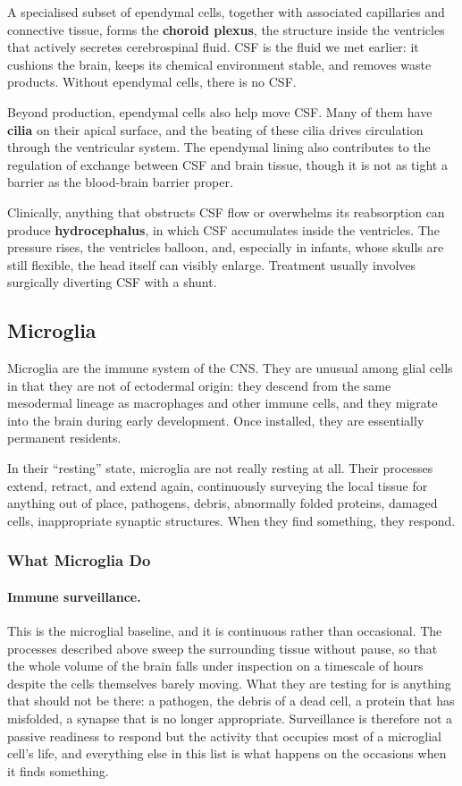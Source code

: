 \documentclass[11pt]{article}
\begin{document}
A specialised subset of ependymal cells, together with associated capillaries and connective tissue, forms the \textbf{choroid plexus}, the structure inside the ventricles that actively secretes cerebrospinal fluid. CSF is the fluid we met earlier: it cushions the brain, keeps its chemical environment stable, and removes waste products. Without ependymal cells, there is no CSF.

Beyond production, ependymal cells also help move CSF. Many of them have \textbf{cilia} on their apical surface, and the beating of these cilia drives circulation through the ventricular system. The ependymal lining also contributes to the regulation of exchange between CSF and brain tissue, though it is not as tight a barrier as the blood-brain barrier proper.

Clinically, anything that obstructs CSF flow or overwhelms its reabsorption can produce \textbf{hydrocephalus}, in which CSF accumulates inside the ventricles. The pressure rises, the ventricles balloon, and, especially in infants, whose skulls are still flexible, the head itself can visibly enlarge. Treatment usually involves surgically diverting CSF with a shunt.

\subsection{Microglia}

Microglia are the immune system of the CNS. They are unusual among glial cells in that they are not of ectodermal origin: they descend from the same mesodermal lineage as macrophages and other immune cells, and they migrate into the brain during early development. Once installed, they are essentially permanent residents.

In their ``resting'' state, microglia are not really resting at all. Their processes extend, retract, and extend again, continuously surveying the local tissue for anything out of place, pathogens, debris, abnormally folded proteins, damaged cells, inappropriate synaptic structures. When they find something, they respond.

\subsubsection{What Microglia Do}

\paragraph{Immune surveillance.} This is the microglial baseline, and it is continuous rather than occasional. The processes described above sweep the surrounding tissue without pause, so that the whole volume of the brain falls under inspection on a timescale of hours despite the cells themselves barely moving. What they are testing for is anything that should not be there: a pathogen, the debris of a dead cell, a protein that has misfolded, a synapse that is no longer appropriate. Surveillance is therefore not a passive readiness to respond but the activity that occupies most of a microglial cell's life, and everything else in this list is what happens on the occasions when it finds something.
\end{document}

